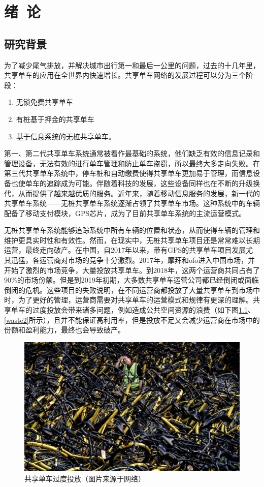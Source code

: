 \documentclass[]{tongjithesis}
\numberwithin{equation}{chapter}
\begin{document}
\toc

\mainmatter

\chapter{绪~论}
\section{研究背景}
为了减少尾气排放，并解决城市出行第一和最后一公里的问题，过去的十几年里，共享单车的应用在全世界内快速增长。共享单车网络的发展过程可以分为三个阶段：
\begin{enumerate}
	\item 无锁免费共享单车
	\item 有桩基于押金的共享单车
	\item 基于信息系统的无桩共享单车\cite{demaio2009bike,shaheen2010bikesharing,fishman2016bikeshare}。
\end{enumerate}
第一、第二代共享单车系统通常被看作最基础的系统，他们缺乏有效的信息记录和管理设备，无法有效的进行单车管理和防止单车盗窃，所以最终大多走向失败。在第三代共享单车系统中，停车桩和自动缴费使得共享单车更加易于管理，而信息设备也使单车的追踪成为可能。伴随着科技的发展，这些设备同样也在不断的升级换代，从而提供了越来越优质的服务。近年来，随着移动信息服务的发展，新一代的共享单车系统——无桩共享单车系统逐渐占领了共享单车市场。这种系统中的车辆配备了移动支付模块，GPS芯片，成为了目前共享单车系统的主流运营模式。

无桩共享单车系统能够追踪系统中所有车辆的位置和状态，从而使得车辆的管理和维护更具实时性和有效性。然而，在现实中，无桩共享单车项目还是常常难以长期运营，最终走向破产。在中国，自2017年以来，带有GPS的共享单车项目发展尤其迅猛，各运营商对市场的竞争十分激烈。2017年，摩拜和ofo进入中国市场，并开始了激烈的市场竞争，大量投放共享单车。到2018年，这两个运营商共同占有了90\%的市场份额。但是到2019年初期，大多数共享单车运营公司都已经倒闭或面临倒闭的危机。这些项目的失败说明，在不同运营商都投放了大量共享单车到市场中时，为了更好的管理，运营商需要对共享单车的运营模式和规律有更深的理解。共享单车的过度投放会带来诸多问题，例如造成公共空间资源的浪费（如下图\ref{waste1}、\ref{waste2}所示），且并不能保证高利用率，但是投放不足又会减少运营商在市场中的份额和盈利能力，最终也会导致破产。
\begin{figure}[H]
	\centering
	\includegraphics[width= 0.7 \textwidth]{figures_main/waste.jpg}
	\caption{共享单车过度投放（图片来源于网络）}
	\label{waste1}
\end{figure}
\end{document}
